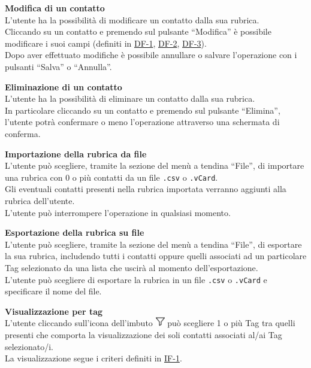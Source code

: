 \begin{tcolorbox}[breakable, colback=white,colframe=black!80!white,title=\textbf{Funzionalità individuali IF}]
\begin{itemize}[itemsep=2pt, topsep=0pt]
		\item[\textbf{IF-5}] \textbf{Modifica di un contatto}
		\\L’utente ha la possibilità di modificare un contatto dalla sua rubrica.
		\\Cliccando su un contatto e premendo sul pulsante “Modifica” è possibile modificare i suoi campi (definiti in \hyperlink{DF-1}{DF-1}, \hyperlink{DF-2}{DF-2}, \hyperlink{DF-3}{DF-3}). 
		\\Dopo aver effettuato modifiche è possibile annullare o salvare l’operazione con i pulsanti “Salva” o “Annulla”.
		
		\item[\textbf{IF-6}] \textbf{Eliminazione di un contatto}
		\\L’utente ha la possibilità di eliminare un contatto dalla sua rubrica. 
		\\In particolare cliccando su un contatto e premendo sul pulsante “Elimina”, l’utente potrà confermare o meno l’operazione attraverso una schermata di conferma.
		
		\item[\textbf{IF-7}] \textbf{Importazione della rubrica da file}
		\\L’utente può scegliere, tramite la sezione del menù a tendina “File”, di importare una rubrica con 0 o più contatti da un file \texttt{.csv} o \texttt{.vCard}. 
		\\Gli eventuali contatti presenti nella rubrica importata verranno aggiunti alla rubrica dell’utente. 
		\\L’utente può interrompere l’operazione in qualsiasi momento.
	
		\item[\textbf{IF-8}] \textbf{Esportazione della rubrica su file}
		\\L’utente può scegliere, tramite la sezione del menù a tendina “File”, di esportare la sua rubrica, includendo tutti i contatti oppure quelli associati ad un particolare Tag selezionato da una lista che uscirà al momento dell’esportazione.
		\\L’utente può scegliere di esportare la rubrica in un file \texttt{.csv} o \texttt{.vCard} e specificare il nome del file. 
		
		\hypertarget{IF-9}{\item[\textbf{IF-9}]} \textbf{Visualizzazione per tag}
		\\L’utente cliccando sull’icona dell’imbuto \includegraphics[height=0.4cm]{images/imbuto_icona.jpeg} può scegliere 1 o più Tag tra quelli presenti che comporta la visualizzazione dei soli contatti associati al/ai Tag selezionato/i.
		\\La visualizzazione segue i criteri definiti in \hyperlink{IF-1}{IF-1}.		
	\end{itemize}
\end{tcolorbox}

